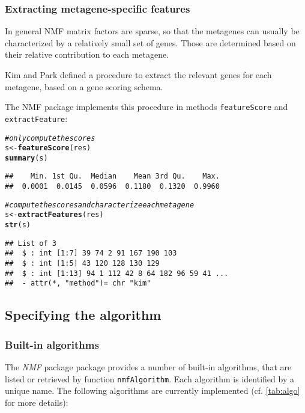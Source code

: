 \documentclass[a4paper]{article}\usepackage[]{graphicx}\usepackage[]{color}
\makeatletter
\newcommand{\hlcom}[1]{\textcolor[rgb]{0.678,0.584,0.686}{\textit{#1}}}%
\newcommand{\hlstd}[1]{\textcolor[rgb]{0.345,0.345,0.345}{#1}}%
\newcommand{\hlkwb}[1]{\textcolor[rgb]{0.69,0.353,0.396}{#1}}%
\newcommand{\hlkwd}[1]{\textcolor[rgb]{0.737,0.353,0.396}{\textbf{#1}}}%
\newenvironment{kframe}{%
 \def\at@end@of@kframe{}%
 \ifinner\ifhmode%
  \def\at@end@of@kframe{\end{minipage}}%
  \begin{minipage}{\columnwidth}%
 \fi\fi%
 \def\FrameCommand##1{\hskip\@totalleftmargin \hskip-\fboxsep
 \colorbox{shadecolor}{##1}\hskip-\fboxsep
     \hskip-\linewidth \hskip-\@totalleftmargin \hskip\columnwidth}%
 \MakeFramed {\advance\hsize-\width
   \@totalleftmargin\z@ \linewidth\hsize
   \@setminipage}}%
 {\par\unskip\endMakeFramed%
 \at@end@of@kframe}
\newenvironment{knitrout}{}{} %
\let\code=\texttt
\newcommand{\pkgname}[1]{\textit{#1}\xspace}
\newcommand{\Rpkg}[1]{\pkgname{#1} package\xspace}
\newcommand{\nmfpack}{\Rpkg{NMF}}
\renewcommand{\cite}[1]{\parencite{#1}}
\makeatother
\begin{document}
\subsubsection{Extracting metagene-specific features}

In general NMF matrix factors are sparse, so that the metagenes can usually be characterized by a relatively small set of genes. Those are determined based on 
their relative contribution to each metagene.

Kim and Park \cite{KimH2007} defined a procedure to extract the relevant genes for each metagene, based on a gene scoring schema.

The NMF package implements this procedure in methods \code{featureScore} and \code{extractFeature}:

\begin{knitrout}
\color{fgcolor}\begin{kframe}
\begin{alltt}
\hlcom{# only compute the scores}
\hlstd{s} \hlkwb{<-} \hlkwd{featureScore}\hlstd{(res)}
\hlkwd{summary}\hlstd{(s)}
\end{alltt}
\begin{verbatim}
##    Min. 1st Qu.  Median    Mean 3rd Qu.    Max. 
##  0.0001  0.0145  0.0596  0.1180  0.1320  0.9960
\end{verbatim}
\begin{alltt}
\hlcom{# compute the scores and characterize each metagene}
\hlstd{s} \hlkwb{<-} \hlkwd{extractFeatures}\hlstd{(res)}
\hlkwd{str}\hlstd{(s)}
\end{alltt}
\begin{verbatim}
## List of 3
##  $ : int [1:7] 39 74 2 91 167 190 103
##  $ : int [1:5] 43 120 128 130 129
##  $ : int [1:13] 94 1 112 42 8 64 182 96 59 41 ...
##  - attr(*, "method")= chr "kim"
\end{verbatim}
\end{kframe}
\end{knitrout}

\subsection{Specifying the algorithm}\label{sec:algo}

\subsubsection{Built-in algorithms}
The \nmfpack package provides a number of built-in algorithms, that are listed or retrieved by function \code{nmfAlgorithm}. 
Each algorithm is identified by a unique name.
The following algorithms are currently implemented (cf. \cref{tab:algo} for more details):
\end{document}
